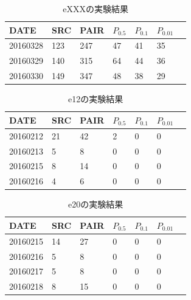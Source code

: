 \documentclass[twocolumn,10pt]{ltjsarticle}
\begin{document}
\begin{table}[htbp]
    \centering
    \caption{eXXXの実験結果}

    \begin{tabular}{C{13mm}||L{7mm}L{7mm}L{7mm}L{7mm}L{7mm}L{7mm}}
        \hline
        DATE & SRC & PAIR & ${P_{0.5}}$ & ${P_{0.1}}$ & ${P_{0.01}}$ \\
        \hline \hline
        20160328  & 123 & 247 & 47 & 41 & 35 \\
        20160329  & 140 & 315 & 64 & 44 & 36 \\
        20160330  & 149 & 347 & 48 & 38 & 29 \\
        \hline
    \end{tabular}
    \label{tab:eXXX}
\end{table}

\begin{table}[htbp]
    \centering
    \caption{e12の実験結果}

    \begin{tabular}{C{13mm}||L{7mm}L{7mm}L{7mm}L{7mm}L{7mm}L{7mm}}
        \hline
        DATE & SRC & PAIR & ${P_{0.5}}$ & ${P_{0.1}}$ & ${P_{0.01}}$ \\
        \hline \hline
        20160212  & 21 & 42 & 2 & 0 & 0 \\
        20160213  & 5  & 8  & 0 & 0 & 0 \\
        20160215  & 8  & 14 & 0 & 0 & 0 \\
        20160216  & 4  & 6  & 0 & 0 & 0 \\
        \hline
    \end{tabular}
    \label{tab:e12}
\end{table}

\begin{table}[htbp]
    \centering
    \caption{e20の実験結果}

    \begin{tabular}{C{13mm}||L{7mm}L{7mm}L{7mm}L{7mm}L{7mm}L{7mm}}
        \hline
        DATE & SRC & PAIR & ${P_{0.5}}$ & ${P_{0.1}}$ & ${P_{0.01}}$ \\
        \hline \hline
        20160215  & 14 & 27 & 0 & 0 & 0 \\
        20160216  & 5  & 8  & 0 & 0 & 0 \\
        20160217  & 5  & 8  & 0 & 0 & 0 \\
        20160218  & 8  & 15 & 0 & 0 & 0 \\
        \hline
    \end{tabular}
    \label{tab:e20}
\end{table}
\end{document}
